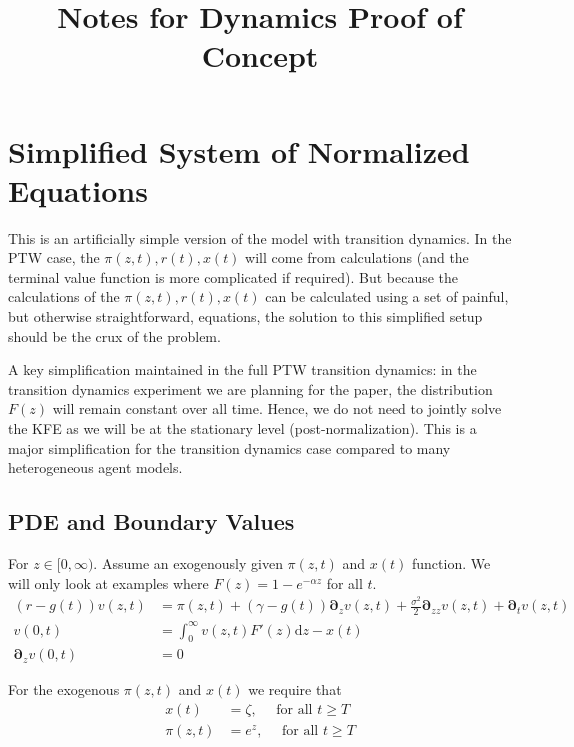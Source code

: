 \documentclass[11pt]{article}
\newcommand{\D}[1][]{\ensuremath{\boldsymbol{\partial}_{#1}}}
\newcommand{\diff}{\ensuremath{\mathrm{d}}}
\begin{document}
\title{Notes for Dynamics Proof of Concept}
\maketitle

\section{Simplified System of Normalized Equations}
This is an artificially simple version of the model with transition dynamics.  In the PTW case, the $\pi(z,t), r(t), x(t)$ will come from  calculations (and the terminal value function is more complicated if required).  But because the calculations of the $\pi(z,t), r(t), x(t)$ can be calculated using a set of painful, but otherwise straightforward, equations, the solution to this simplified setup should be the crux of the problem.

A key simplification maintained in the full PTW transition dynamics: in the transition dynamics experiment we are planning for the paper, the distribution $F(z)$ will remain constant over all time.  Hence, we do not need to jointly solve the KFE as we will be at the stationary level (post-normalization).  This is a major simplification for the transition dynamics case compared to many heterogeneous agent models.

\subsection{PDE and Boundary Values}
For $z\in[0,\infty)$.  Assume an exogenously given $\pi(z,t)$ and $x(t)$ function.  We will only look at examples where $F(z) = 1 - e^{-\alpha z}$ for all $t$.
\begin{align}
	(r - g(t)) v(z,t) &= \pi(z,t) + (\gamma - g(t)) \D[z] v(z,t) + \tfrac{\sigma^2}{2} \D[zz] v(z,t) + \D[t]v(z,t)\label{eq:bellman-GBM-dynamic}	\\
v(0,t) &= \int_{0}^{\infty} v(z,t) F'(z)\diff z - x(t)\label{eq:vm-GBM-dynamic}\\
\D[z]v(0,t) &= 0\label{eq:sp-GBM-dynamic}
\end{align}

For the exogenous $\pi(z,t)$ and $x(t)$ we require that
\begin{align}
x(t) &= \zeta,\quad \text{ for all }t \geq T\label{eq:terminal-x}\\
\pi(z,t) &= e^z,\quad \text{ for all }t \geq T\label{eq:terminal-pi}
\end{align}
\end{document}
